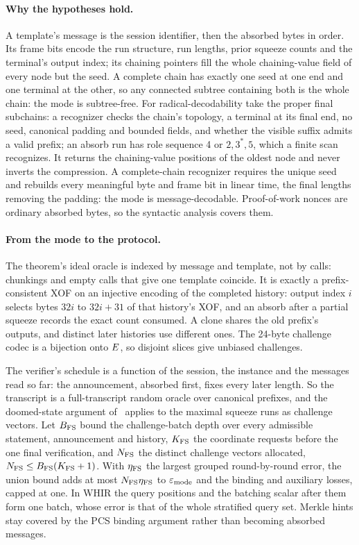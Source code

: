 \paragraph{Why the hypotheses hold.} A template's message is the session identifier, then the absorbed bytes in order. Its frame bits encode the run structure, run lengths, prior squeeze counts and the terminal's output index; its chaining pointers fill the whole chaining-value field of every node but the seed. A complete chain has exactly one seed at one end and one terminal at the other, so any connected subtree containing both is the whole chain: the mode is subtree-free. For radical-decodability take the proper final subchains: a recognizer checks the chain's topology, a terminal at its final end, no seed, canonical padding and bounded fields, and whether the visible suffix admits a valid prefix; an absorb run has role sequence 4 or $2,3^*,5$, which a finite scan recognizes. It returns the chaining-value positions of the oldest node and never inverts the compression. A complete-chain recognizer requires the unique seed and rebuilds every meaningful byte and frame bit in linear time, the final lengths removing the padding: the mode is message-decodable. Proof-of-work nonces are ordinary absorbed bytes, so the syntactic analysis covers them.

\paragraph{From the mode to the protocol.} The theorem's ideal oracle is indexed by message and template, not by calls: chunkings and empty calls that give one template coincide. It is exactly a prefix-consistent XOF on an injective encoding of the completed history: output index $i$ selects bytes $32i$ to $32i+31$ of that history's XOF, and an absorb after a partial squeeze records the exact count consumed. A clone shares the old prefix's outputs, and distinct later histories use different ones. The 24-byte challenge codec is a bijection onto $E$, so disjoint slices give unbiased challenges.

The verifier's schedule is a function of the session, the instance and the messages read so far: the announcement, absorbed first, fixes every later length. So the transcript is a full-transcript random oracle over canonical prefixes, and the doomed-state argument of~\cite[Definition 5.3 and Theorem 5.8]{CCHLRR18} applies to the maximal squeeze runs as challenge vectors. Let $B_{\mathrm{FS}}$ bound the challenge-batch depth over every admissible statement, announcement and history, $K_{\mathrm{FS}}$ the coordinate requests before the one final verification, and $N_{\mathrm{FS}}$ the distinct challenge vectors allocated, $N_{\mathrm{FS}}\le B_{\mathrm{FS}}(K_{\mathrm{FS}}+1)$. With $\eta_{\mathrm{FS}}$ the largest grouped round-by-round error, the union bound adds at most $N_{\mathrm{FS}}\eta_{\mathrm{FS}}$ to $\varepsilon_{\mathrm{mode}}$ and the binding and auxiliary losses, capped at one. In WHIR the query positions and the batching scalar after them form one batch, whose error is that of the whole stratified query set. Merkle hints stay covered by the PCS binding argument rather than becoming absorbed messages.

